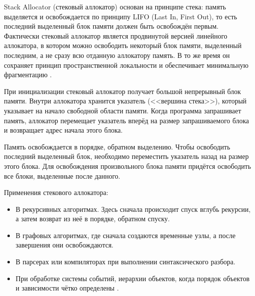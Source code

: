 Stack Allocator (стековый аллокатор) основан на принципе стека: память выделяется и освобождается по принципу LIFO (Last In, First Out), то есть последний выделенный блок памяти должен быть освобождён первым. Фактически стековый аллокатор является продвинутой версией линейного аллокатора, в котором можно освободить некоторый блок памяти, выделенный последним, а не сразу всю отданную аллокатору память. В то же время он сохраняет принцип пространственной локальности и обеспечивает минимальную фрагментацию \cite{github-allocators}.

При инициализации стековый аллокатор получает большой непрерывный блок памяти. Внутри аллокатора хранится указатель (<<вершина стека>>), который указывает на начало свободной области памяти. Когда программа запрашивает память, аллокатор перемещает указатель вперёд на размер запрашиваемого блока и возвращает адрес начала этого блока.

Память освобождается в порядке, обратном выделению. Чтобы освободить последний выделенный блок, необходимо переместить указатель назад на размер этого блока. Для освобождения произвольного блока памяти придётся освободить все блоки, выделенные после данного.

Применения стекового аллокатора:

\begin{itemize}
	\item В рекурсивных алгоритмах. Здесь сначала происходит спуск вглубь рекурсии, а затем возврат из неё в порядке, обратном спуску.
	\item В графовых алгоритмах, где сначала создаются временные узлы, а после завершения они освобождаются.
	\item В парсерах или компиляторах при выполнении синтаксического разбора.
	\item При обработке системы событий, иерархии объектов, когда порядок объектов и зависимости чётко определены \cite{game++}.
\end{itemize}
